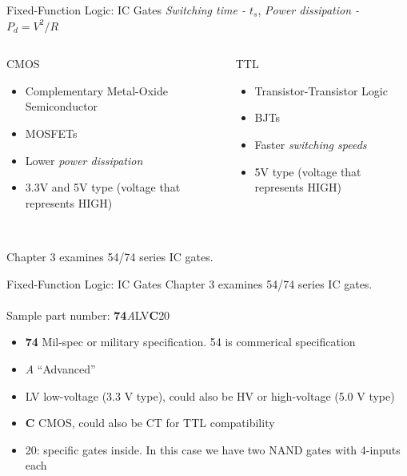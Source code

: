 \documentclass{beamer}
\begin{document}
\begin{frame}{Fixed-Function Logic: IC Gates}
\textit{Switching time - $t_s$}, \textit{Power dissipation - $P_d = V^2/R$} \\ \vspace{0.5cm}
\begin{columns}[T]
\begin{column}{0.5\textwidth}
CMOS \\ \hrulefill
\begin{itemize}
\item Complementary Metal-Oxide Semiconductor
\item MOSFETs
\item Lower \textit{power dissipation}
\item 3.3V and 5V type (voltage that represents HIGH)
\end{itemize}
\end{column}
\begin{column}{0.5\textwidth}
TTL \\ \hrulefill
\begin{itemize}
\item Transistor-Transistor Logic
\item BJTs
\item Faster \textit{switching speeds}
\item 5V type (voltage that represents HIGH)
\end{itemize}
\end{column}
\end{columns}
\hrulefill \\
Chapter 3 examines 54/74 series IC gates.
\end{frame}

\begin{frame}{Fixed-Function Logic: IC Gates}
Chapter 3 examines 54/74 series IC gates. \\ \vspace{0.5cm}
 \\ \vspace{0.5cm}
Sample part number: \textbf{74}\textit{A}\alert{LV}\textbf{\alert{C}}20
\begin{itemize}
\item \textbf{74} Mil-spec or military specification.  54 is commerical specification
\item \textit{A} ``Advanced''
\item \alert{LV} low-voltage (3.3 V type), could also be HV or high-voltage (5.0 V type)
\item \textbf{\alert{C}} CMOS, could also be CT for TTL compatibility
\item 20: specific gates inside.  In this case we have two NAND gates with 4-inputs each
\end{itemize}
\end{frame}
\end{document}

